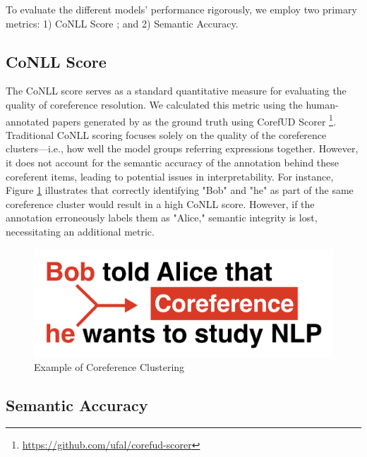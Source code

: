 To evaluate the different models' performance rigorously, we employ two primary metrics: 1) CoNLL Score \citep{pradhan2012conll}; and 2) Semantic Accuracy.

\subsection{CoNLL Score}
The CoNLL score serves as a standard quantitative measure for evaluating the quality of coreference resolution. We calculated this metric using the human-annotated papers generated by \citet{asakura2022building} as the ground truth using CorefUD Scorer \footnote{\url{https://github.com/ufal/corefud-scorer}}. Traditional CoNLL scoring focuses solely on the quality of the coreference clusters—i.e., how well the model groups referring expressions together. However, it does not account for the semantic accuracy of the annotation behind these coreferent items, leading to potential issues in interpretability. For instance, Figure \ref{fig:coreference} illustrates that correctly identifying "Bob" and "he" as part of the same coreference cluster would result in a high CoNLL score. However, if the annotation erroneously labels them as "Alice," semantic integrity is lost, necessitating an additional metric.

\begin{figure}[htpb]
  \centering
  \begin{minipage}{\textwidth}
    \centering
    \includegraphics[width=14cm]{images/coreference.png}
    \caption[Example for coreference]{Example of Coreference Clustering \citep{asakura2022building}\footnotemark}
    \label{fig:coreference}
  \end{minipage}
\end{figure}

\subsection{Semantic Accuracy}

